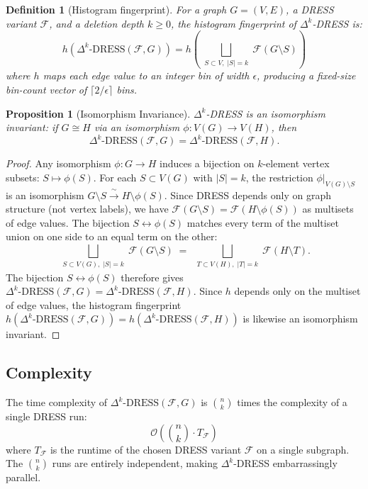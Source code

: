 \documentclass[11pt,a4paper]{article}
\newtheorem{proposition}[theorem]{Proposition}
\newtheorem{definition}[theorem]{Definition}
\begin{document}
\begin{definition}[Histogram fingerprint]
\label{def:histogram-fp}
For a graph $G = (V, E)$, a DRESS variant $\mathcal{F}$, and a deletion depth $k \ge 0$, the histogram fingerprint of $\Delta^k$-DRESS is:
\[
h\!\left(\Delta^k\text{-DRESS}(\mathcal{F}, G)\right) = h\!\left(\bigsqcup_{\substack{S \subset V,\; |S|=k}} \mathcal{F}(G \setminus S)\right)
\]
where $h$ maps each edge value to an integer bin of width $\epsilon$, producing a fixed-size bin-count vector of $\lceil 2/\epsilon \rceil$ bins.
\end{definition}

\begin{proposition}[Isomorphism Invariance]
\label{prop:delta-k-iso}
$\Delta^k$-DRESS is an isomorphism invariant: if $G \cong H$ via an isomorphism $\phi: V(G) \to V(H)$, then
\[
\Delta^k\text{-DRESS}(\mathcal{F}, G) = \Delta^k\text{-DRESS}(\mathcal{F}, H).
\]
\end{proposition}

\begin{proof}
Any isomorphism $\phi: G \to H$ induces a bijection on $k$-element vertex subsets: $S \mapsto \phi(S)$. For each $S \subset V(G)$ with $|S|=k$, the restriction $\phi|_{V(G)\setminus S}$ is an isomorphism $G \setminus S \xrightarrow{\;\sim\;} H \setminus \phi(S)$. Since DRESS depends only on graph structure (not vertex labels), we have $\mathcal{F}(G \setminus S) = \mathcal{F}(H \setminus \phi(S))$ as multisets of edge values. The bijection $S \leftrightarrow \phi(S)$ matches every term of the multiset union on one side to an equal term on the other:
\[
\bigsqcup_{\substack{S \subset V(G),\; |S|=k}} \mathcal{F}(G \setminus S)
\;=\;
\bigsqcup_{\substack{T \subset V(H),\; |T|=k}} \mathcal{F}(H \setminus T).
\]
The bijection $S \leftrightarrow \phi(S)$ therefore gives $\Delta^k\text{-DRESS}(\mathcal{F}, G) = \Delta^k\text{-DRESS}(\mathcal{F}, H)$. Since $h$ depends only on the multiset of edge values, the histogram fingerprint $h(\Delta^k\text{-DRESS}(\mathcal{F}, G)) = h(\Delta^k\text{-DRESS}(\mathcal{F}, H))$ is likewise an isomorphism invariant.
\end{proof}

\subsection{Complexity}
\label{sec:complexity}

The time complexity of $\Delta^k\text{-DRESS}(\mathcal{F}, G)$ is $\binom{n}{k}$ times the complexity of a single DRESS run:
\[
\mathcal{O}\!\left(\binom{n}{k} \cdot T_{\mathcal{F}}\right)
\]
where $T_{\mathcal{F}}$ is the runtime of the chosen DRESS variant $\mathcal{F}$ on a single subgraph. The $\binom{n}{k}$ runs are entirely independent, making $\Delta^k$-DRESS embarrassingly parallel.
\end{document}
